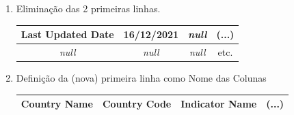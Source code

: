 \begin{enumerate}
    \item Eliminação das 2 primeiras linhas.
    \begin{table}[H]
        \centering
        \begin{tabular}{|c|c|c|c|}
        \hline
            Last Updated Date & 16/12/2021 & \textit{null} & (...) \\
        \hline
            \textit{null} & \textit{null} & \textit{null} & etc.\\
        \hline
        \end{tabular}
    \end{table}
    
    \item Definição da (nova) primeira linha como Nome das Colunas
    \begin{table}[H]
        \centering
        \begin{tabular}{|c|c|c|c|}
        \hline
            Country Name & Country Code & Indicator Name & (...) \\
        \hline
        \end{tabular}
    \end{table}
\end{enumerate}